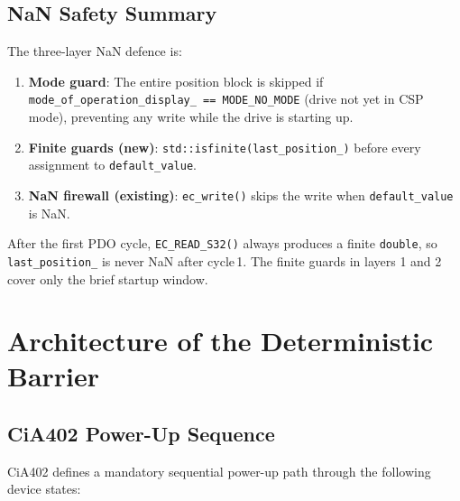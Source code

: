 \documentclass[11pt,a4paper]{article}
\begin{document}
\subsection{NaN Safety Summary}

The three-layer NaN defence is:
\begin{enumerate}[nosep]
  \item \textbf{Mode guard}: The entire position block is skipped if
        \texttt{mode\_of\_operation\_display\_ == MODE\_NO\_MODE} (drive not
        yet in CSP mode), preventing any write while the drive is starting up.
  \item \textbf{Finite guards (new)}: \texttt{std::isfinite(last\_position\_)}
        before every assignment to \texttt{default\_value}.
  \item \textbf{NaN firewall (existing)}: \texttt{ec\_write()} skips the write
        when \texttt{default\_value} is NaN.
\end{enumerate}

After the first PDO cycle, \texttt{EC\_READ\_S32()} always produces a finite
\texttt{double}, so \texttt{last\_position\_} is never NaN after cycle\,1.
The finite guards in layers 1 and 2 cover only the brief startup window.

\section{Architecture of the Deterministic Barrier}
\label{sec:barrier-arch}

\subsection{CiA402 Power-Up Sequence}

CiA402 defines a mandatory sequential power-up path through the following
device states:

\begin{center}
\end{center}
\end{document}
